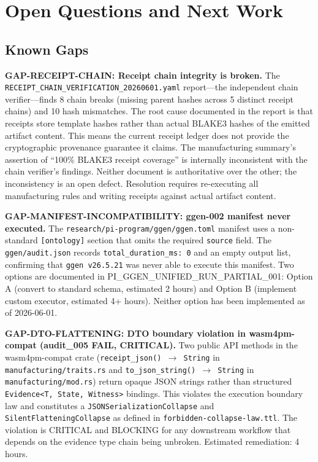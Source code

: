 
\section{Open Questions and Next Work}
\label{sec:research-pi-program-openq}

\subsection{Known Gaps}
\label{sec:research-pi-program-openq-gaps}

\textbf{GAP-RECEIPT-CHAIN: Receipt chain integrity is broken.} The \texttt{RECEIPT\_CHAIN\_VERIFICATION\_20260601.yaml} report---the independent chain verifier---finds 8 chain breaks (missing parent hashes across 5 distinct receipt chains) and 10 hash mismatches. The root cause documented in the report is that receipts store template hashes rather than actual BLAKE3 hashes of the emitted artifact content. This means the current receipt ledger does not provide the cryptographic provenance guarantee it claims. The manufacturing summary's assertion of ``100\% BLAKE3 receipt coverage'' is internally inconsistent with the chain verifier's findings. Neither document is authoritative over the other; the inconsistency is an open defect. Resolution requires re-executing all manufacturing rules and writing receipts against actual artifact content.

\textbf{GAP-MANIFEST-INCOMPATIBILITY: ggen-002 manifest never executed.} The \texttt{research/pi-program/ggen/ggen.toml} manifest uses a non-standard \texttt{[ontology]} section that omits the required \texttt{source} field. The \texttt{ggen/audit.json} records \texttt{total\_duration\_ms: 0} and an empty output list, confirming that \texttt{ggen v26.5.21} was never able to execute this manifest. Two options are documented in PI\_GGEN\_UNIFIED\_RUN\_PARTIAL\_001: Option A (convert to standard schema, estimated 2 hours) and Option B (implement custom executor, estimated 4+ hours). Neither option has been implemented as of 2026-06-01.

\textbf{GAP-DTO-FLATTENING: DTO boundary violation in wasm4pm-compat (audit\_005 FAIL, CRITICAL).} Two public API methods in the wasm4pm-compat crate (\texttt{receipt\_json() $\to$ String} in \texttt{manufacturing/traits.rs} and \texttt{to\_json\_string() $\to$ String} in \texttt{manufacturing/mod.rs}) return opaque JSON strings rather than structured \texttt{Evidence<T, State, Witness>} bindings. This violates the execution boundary law and constitutes a \texttt{JSONSerializationCollapse} and \texttt{SilentFlatteningCollapse} as defined in \texttt{forbidden-collapse-law.ttl}. The violation is CRITICAL and BLOCKING for any downstream workflow that depends on the evidence type chain being unbroken. Estimated remediation: 4 hours.

